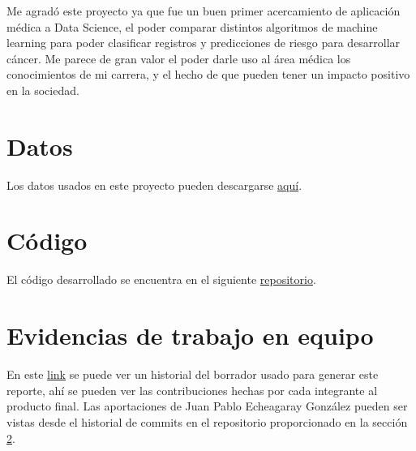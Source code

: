 \documentclass[journal]{IEEEtran}                                                          %
\begin{document}
            Me agradó este proyecto ya que fue un buen primer acercamiento de aplicación médica a Data Science, el poder comparar distintos algoritmos de machine learning para poder clasificar registros y predicciones de riesgo para desarrollar cáncer. Me parece de gran valor el poder darle uso al área médica los conocimientos de mi carrera, y el hecho de que pueden tener un impacto positivo en la sociedad.
        
    \appendices
    
    \section{Datos} \label{data}

        Los datos usados en este proyecto pueden descargarse \href{https://www.kaggle.com/code/ravaliraj/risk-classification-of-cervical-cancer}{aquí}.

    \section{Código}\label{repo}

        El código desarrollado se encuentra en el siguiente \href{https://github.com/JuanEcheagaray75/cancer-clf}{repositorio}.
    \section{Evidencias de trabajo en equipo}
        
        En este \href{https://docs.google.com/document/d/1febGMKH0Z8mdPzhVf\_FTBrOR3ENYA2iGw5Lfeg8XTjk/edit?usp=sharing}{link} se puede ver un historial del borrador usado para generar este reporte, ahí se pueden ver las contribuciones hechas por cada integrante al producto final. Las aportaciones de Juan Pablo Echeagaray González pueden ser vistas desde el historial de commits en el repositorio proporcionado en la sección \ref{repo}.



    
    
\end{document}
